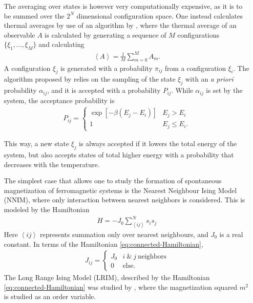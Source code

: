The averaging over states is however very computationally expensive, as it is to be summed over the $2^N$ dimensional configuration space. One instead calculates thermal averages by use of an algorithm by \cite{Metropolis1953}, where the thermal average of an observable $A$ is calculated by generating a sequence of $M$ configurations $\{ \xi_1, \ldots, \xi_M \}$ and calculating  
\begin{align}
	\left<A \right> = \frac{1}{M} \sum_{m=0}^M A_m.
\end{align}
A configuration $\xi_j$  is generated with a probability $\pi_{ij}$ from a configuration $\xi_i$. The algorithm proposed by \cite{Metropolis1953} relies on the sampling of the state $\xi_j$ with an \textit{a priori} probability  $\alpha_{ij}$, and it is accepted with a probability $P_{ij}$. While $\alpha_{ij}$ is set by the system, the acceptance probability is  \begin{align}
	P_{ij} = 
	\begin{cases}
		\exp[-\beta (E_{j}	- E_{i})] & E_j > E_i \\
		1 & E_j \leq E_i. 
	\end{cases}
	\label{eq:acceptance-probability}
\end{align}

This way, a new state $\xi_j$ is always accepted if it lowers the total energy of the system, but also accepts states of total higher energy with a probability that decreases with the temperature.

The simplest case that allows one to study the formation of spontaneous magnetization of ferromagnetic systems is the Nearest Neighbour Ising Model (NNIM), where only interaction between nearest neighbors is considered. This is modeled by the Hamiltonian
\begin{align}
	H  = - J_0 \sum_{\left<ij \right>}^N s_i s_j
\end{align} 
Here $\left< ij \right>$ represents summation only over nearest neighbours, and $J_0$ is a real constant. In terms of the Hamiltonian \eqref{eq:connected-Hamiltonian}, 
\begin{align}
	J_{ij} = 
	\begin{cases}
	J_0 & i ~\& ~j ~\text{neighbors} \\	
	0 & \text{else}.
	\end{cases}
\end{align}
The Long Range Ising Model (LRIM), described by the Hamiltonian \eqref{eq:connected-Hamiltonian} was studied by \cite{Janke2023}, where the magnetization squared $m^2$ is studied as an order variable. 

